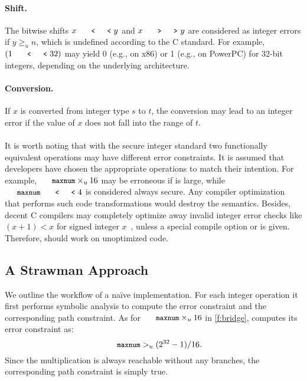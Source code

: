 \paragraph{Shift.}
The bitwise shifts $x \shl y$ and $x \shr y$ are considered as
integer errors if $y \geq_u n$, which is undefined according to the
C standard.  For example, $(1 \shl 32)$ may yield 0 (e.g., on x86)
or 1 (e.g., on PowerPC) for 32-bit integers, depending on the
underlying architecture.

\paragraph{Conversion.}
If $x$ is converted from integer type $s$ to $t$, the conversion
may lead to an integer error if the value of $x$ does not fall into
the range of $t$.

\paragraph{}
It is worth noting that with the secure integer standard two
functionally equivalent operations may have different error constraints.
It is assumed that developers have chosen the appropriate operations
to match their intention.  For example, $\cc{maxnum}\times_u 16$
may be erroneous if  is large, while $\cc{maxnum} \shl
4$ is considered always secure.  Any compiler optimization that
performs such code transformations would destroy the semantics.
Besides, decent C compilers may completely optimize away invalid
integer error checks like $(x + 1) < x$ for signed integer
$x$~\cite{gcc:signed-overflow,us-cert:gcc}, unless a special compile
option  or  is given.  Therefore,
\sys should work on unoptimized code.

\subsection{A Strawman Approach}

We outline the workflow of a na\"ive \sys implementation.  For each
integer operation it first performs symbolic analysis to compute
the error constraint and the corresponding path constraint.  As for
$\cc{maxnum} \times_u 16$ in \autoref{f:bridge}, \sys computes its
error constraint as:
\begin{equation*}
\cc{maxnum} >_u (2^{32} - 1) / 16.
\end{equation*}
Since the multiplication is always reachable without any branches,
the corresponding path constraint is simply true.


